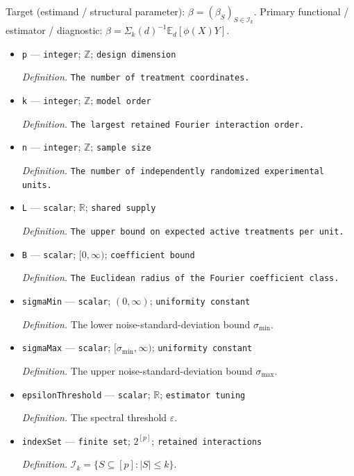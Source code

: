 \documentclass{article}
\begin{document}
Target (estimand / structural parameter): \(\beta=(\beta_S)_{S\in\mathcal I_k}\).
Primary functional / estimator / diagnostic: \(\beta=\Sigma_k(d)^{-1}\mathbb E_d[\phi(X)Y]\).
\begin{itemize}
  \item \texttt{p} --- \texttt{integer}; \(\mathbb Z\); \texttt{design dimension}
  \par\smallskip\noindent\emph{Definition.} \texttt{The number of treatment coordinates.}
  \item \texttt{k} --- \texttt{integer}; \(\mathbb Z\); \texttt{model order}
  \par\smallskip\noindent\emph{Definition.} \texttt{The largest retained Fourier interaction order.}
  \item \texttt{n} --- \texttt{integer}; \(\mathbb Z\); \texttt{sample size}
  \par\smallskip\noindent\emph{Definition.} \texttt{The number of independently randomized experimental units.}
  \item \texttt{L} --- \texttt{scalar}; \(\mathbb R\); \texttt{shared supply}
  \par\smallskip\noindent\emph{Definition.} \texttt{The upper bound on expected active treatments per unit.}
  \item \texttt{B} --- \texttt{scalar}; \([0,\infty)\); \texttt{coefficient bound}
  \par\smallskip\noindent\emph{Definition.} \texttt{The Euclidean radius of the Fourier coefficient class.}
  \item \texttt{sigmaMin} --- \texttt{scalar}; \((0,\infty)\); \texttt{uniformity constant}
  \par\smallskip\noindent\emph{Definition.} The lower noise-standard-deviation bound \(\sigma_{\min}\).
  \item \texttt{sigmaMax} --- \texttt{scalar}; \([\sigma_{\min},\infty)\); \texttt{uniformity constant}
  \par\smallskip\noindent\emph{Definition.} The upper noise-standard-deviation bound \(\sigma_{\max}\).
  \item \texttt{epsilonThreshold} --- \texttt{scalar}; \(\mathbb R\); \texttt{estimator tuning}
  \par\smallskip\noindent\emph{Definition.} The spectral threshold \(\varepsilon\).
  \item \texttt{indexSet} --- \texttt{finite set}; \(2^{[p]}\); \texttt{retained interactions}
  \par\smallskip\noindent\emph{Definition.} \(\mathcal I_k=\{S\subseteq[p]:|S|\le k\}\).

\end{itemize}
\end{document}

